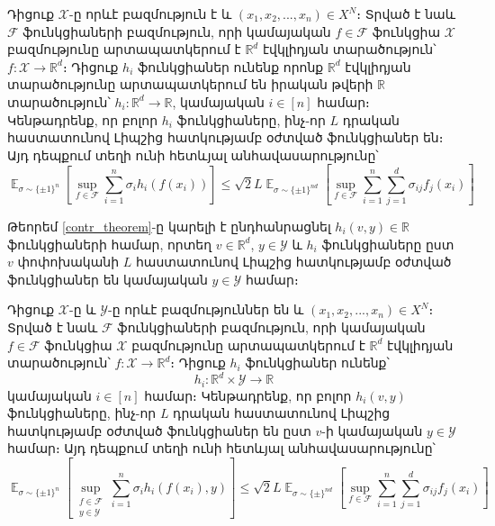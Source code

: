 \documentclass[11pt]{article}
\DeclareMathOperator*{\E}{\mathbb{E}}
\begin{document}
\begin{theorem}
\label{contr_theorem}
Դիցուք $\mathcal{X}$-ը որևէ բազմություն է և $(x_1, x_2, ..., x_n) \in X^N$։ Տրված է նաև $\mathcal{F}$ ֆունկցիաների բազմություն, որի կամայական $f \in \mathcal{F}$ ֆունկցիա $\mathcal{X}$ բազմությունը արտապատկերում է $\mathbb{R}^d$ էվկլիդյան տարածություն՝ $f:\mathcal{X} \rightarrow \mathbb{R}^d$։ Դիցուք $h_i$ ֆունկցիաներ ունենք որոնք $\mathbb{R}^d$ էվկլիդյան տարածությունը արտապատկերում են  իրական թվերի $\mathbb{R}$ տարածություն՝
$h_i:\mathbb{R}^d \rightarrow \mathbb{R}$, կամայական $i \in [n]$ համար։ Կենթադրենք, որ բոլոր $h_i$ ֆունկցիաները, ինչ-որ $L$ դրական հաստատունով Լիպշից հատկությամբ օժտված ֆունկցիաներ են։ Այդ դեպքում տեղի ունի հետևյալ անհավասարությունը՝
\begin{equation}
\label{contradiction_ineq}
\E_{\sigma \sim \{\pm 1\}^n}\left[\sup_{f \in \mathcal{F}}  \sum_{i=1}^n{\sigma_ih_i(f(x_i))}  \right]    \leq \sqrt{2}L \E_{\sigma \sim \{\pm1\}^{nd}} \left[  \sup_{f \in \mathcal{F}}  \sum_{i=1}^n\sum_{j=1}^d{\sigma_{ij}f_j(x_i)}   \right]
\end{equation}
\end{theorem}


\noindent
Թեորեմ \ref{contr_theorem}-ը կարելի է ընդհանրացնել  $h_i(v, y) \in \mathbb{R}$ ֆունկցիաների համար, որտեղ $v \in \mathbb{R}^d$, $y \in \mathcal{Y}$ և $h_i$ ֆունկցիաները ըստ $v$ փոփոխականի $L$ հաստատունով Լիպշից հատկությամբ օժտված ֆունկցիաներ են կամայական $y \in \mathcal{Y}$ համար։ 

\begin{theorem}
\label{contr_theorem}
Դիցուք $\mathcal{X}$-ը և $\mathcal{Y}$-ը որևէ բազմություններ են  և $(x_1, x_2, ..., x_n) \in X^N$։ Տրված է նաև $\mathcal{F}$ ֆունկցիաների բազմություն, որի կամայական $f \in \mathcal{F}$ ֆունկցիա $\mathcal{X}$ բազմությունը արտապատկերում է $\mathbb{R}^d$ էվկլիդյան տարածություն՝ $f:\mathcal{X} \rightarrow \mathbb{R}^d$։ Դիցուք $h_i$ ֆունկցիաներ ունենք՝ $$h_i:\mathbb{R}^d \times \mathcal{Y} \rightarrow \mathbb{R}$$ կամայական $i \in [n]$ համար։ Կենթադրենք, որ բոլոր $h_i(v, y)$ ֆունկցիաները, ինչ-որ $L$ դրական հաստատունով Լիպշից հատկությամբ օժտված ֆունկցիաներ են ըստ $v$-ի կամայական $y \in \mathcal{Y}$ համար։ Այդ դեպքում տեղի ունի հետևյալ անհավասարությունը՝
\begin{equation}
\label{contradiction_ineq}
\E_{\sigma \sim \{\pm 1\}^n}\left[\sup_{\substack{f \in \mathcal{F} \\ y \in \mathcal{Y}} }  \sum_{i=1}^n{\sigma_ih_i(f(x_i), y)}  \right]    \leq \sqrt{2}L \E_{\sigma \sim \{\pm\}^{nd}} \left[  \sup_{f \in \mathcal{F}}  \sum_{i=1}^n\sum_{j=1}^d{\sigma_{ij}f_j(x_i)}   \right]
\end{equation}
\end{theorem}
\end{document}
